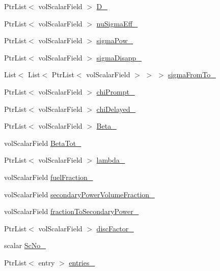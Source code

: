 \begin{DoxyCompactItemize}
\item 
Ptr\+List$<$ vol\+Scalar\+Field $>$ \hyperlink{classFoam_1_1XS_a96fec6b80cb2df43e7ea27107115e475}{D\+\_\+}
\item 
Ptr\+List$<$ vol\+Scalar\+Field $>$ \hyperlink{classFoam_1_1XS_ad9ea9685d6576d9868c809bb50a504fa}{nu\+Sigma\+Eff\+\_\+}
\item 
Ptr\+List$<$ vol\+Scalar\+Field $>$ \hyperlink{classFoam_1_1XS_a2bd39d2565aedaffcd623ae0adbd4921}{sigma\+Pow\+\_\+}
\item 
Ptr\+List$<$ vol\+Scalar\+Field $>$ \hyperlink{classFoam_1_1XS_a2999bf91da8ba50addd3ea539d873d50}{sigma\+Disapp\+\_\+}
\item 
List$<$ List$<$ Ptr\+List$<$ vol\+Scalar\+Field $>$ $>$ $>$ \hyperlink{classFoam_1_1XS_a3446c6c1eba7715a184c7198bcf6d874}{sigma\+From\+To\+\_\+}
\item 
Ptr\+List$<$ vol\+Scalar\+Field $>$ \hyperlink{classFoam_1_1XS_aed62b74823cc5c088012d6ae59d23c1d}{chi\+Prompt\+\_\+}
\item 
Ptr\+List$<$ vol\+Scalar\+Field $>$ \hyperlink{classFoam_1_1XS_ab5552da3b10e90d186bf98aead06bcd4}{chi\+Delayed\+\_\+}
\item 
Ptr\+List$<$ vol\+Scalar\+Field $>$ \hyperlink{classFoam_1_1XS_a7f7fe9267b6666b38fa5534851251f7b}{Beta\+\_\+}
\item 
vol\+Scalar\+Field \hyperlink{classFoam_1_1XS_aada58fbe9089eb21ee65471a6e424c93}{Beta\+Tot\+\_\+}
\item 
Ptr\+List$<$ vol\+Scalar\+Field $>$ \hyperlink{classFoam_1_1XS_a5c475176377784b2717714cb353fa3c0}{lambda\+\_\+}
\item 
vol\+Scalar\+Field \hyperlink{classFoam_1_1XS_a84c8e05dd16ae93d11fcbcf94b099f3f}{fuel\+Fraction\+\_\+}
\item 
vol\+Scalar\+Field \hyperlink{classFoam_1_1XS_aa28c5a5068196250beec05e9965ff0eb}{secondary\+Power\+Volume\+Fraction\+\_\+}
\item 
vol\+Scalar\+Field \hyperlink{classFoam_1_1XS_a76bb21d48d91e623afe804402160c87a}{fraction\+To\+Secondary\+Power\+\_\+}
\item 
Ptr\+List$<$ vol\+Scalar\+Field $>$ \hyperlink{classFoam_1_1XS_a2195b3c3e3a904c4e04924328f611d5c}{disc\+Factor\+\_\+}
\item 
scalar \hyperlink{classFoam_1_1XS_a4c4a4ba88fdfadec3edee27595650f75}{Sc\+No\+\_\+}
\item 
Ptr\+List$<$ entry $>$ \hyperlink{classFoam_1_1XS_ae321eb5a93a161d86891d04ceba5de38}{entries\+\_\+}
\item 

\end{DoxyCompactItemize}
